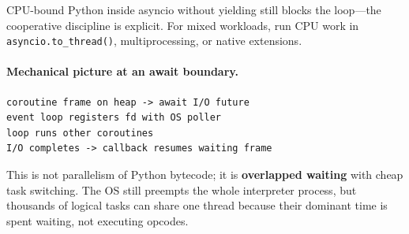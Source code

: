 CPU-bound Python inside asyncio without yielding still blocks the loop---the cooperative discipline is explicit. For mixed workloads, run CPU work in \texttt{asyncio.to\_thread()}, multiprocessing, or native extensions.

\paragraph{Mechanical picture at an await boundary.}
\begin{verbatim}
coroutine frame on heap -> await I/O future
event loop registers fd with OS poller
loop runs other coroutines
I/O completes -> callback resumes waiting frame
\end{verbatim}

This is not parallelism of Python bytecode; it is \textbf{overlapped waiting} with cheap task switching. The OS still preempts the whole interpreter process, but thousands of logical tasks can share one thread because their dominant time is spent waiting, not executing opcodes.
